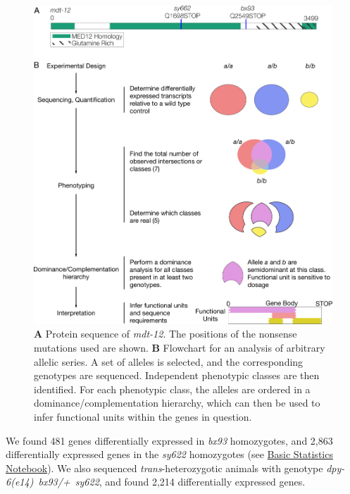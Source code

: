 \documentclass[8pt, twocolumn]{article}
\newcommand{\gene}[1]{\mbox{\emph{#1}}}
\newcommand{\dpy}{\gene{mdt-12}}
\newcommand{\strongn}{2,863}
\newcommand{\weakn}{481}
\newcommand{\transn}{2,214}
\begin{document}
\begin{figure}
  \centering{}
  \includegraphics[width=\textwidth]{../../figs/Flowchart_Conceptual.pdf}
  \caption{
  \textbf{A} Protein sequence of \dpy{}. The positions of the nonsense
  mutations used are shown.
  \textbf{B} Flowchart for an analysis of arbitrary allelic series. A set of
  alleles is selected, and the corresponding genotypes are sequenced.
  Independent phenotypic classes are then identified. For each phenotypic class,
  the alleles are ordered in a dominance/complementation hierarchy, which can
  then be used to infer functional units within the genes in question.}
\label{fig:flowchart}
\end{figure}

We found \weakn{} genes differentially expressed in \emph{bx93} homozygotes, and
\strongn{} differentially expressed genes in the \emph{sy622} homozygotes (see
\href{https://wormlabcaltech.github.io/med-cafe/notebook/basic.html}{Basic
Statistics Notebook}). We also sequenced \emph{trans}-heterozygotic animals with
genotype \gene{dpy-6(e14) bx93/+ sy622}, and found  \transn{} differentially
expressed genes.
\end{document}

